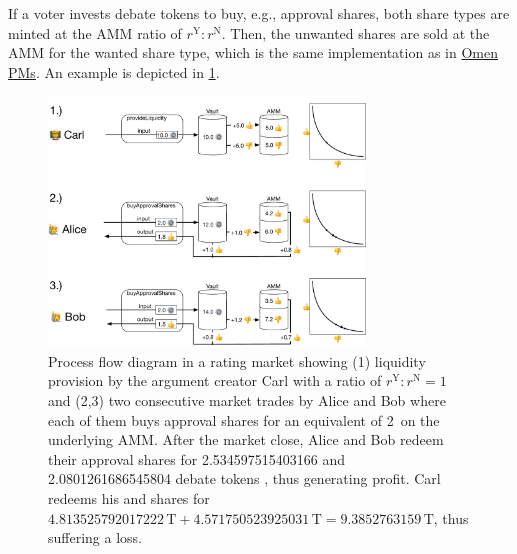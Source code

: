 \documentclass[%
aip,
amsmath,amssymb,
reprint,%
unsortedaddress,
nofootinbib
]{revtex4-2}
\newcommand{\T}{\text{T}}\newcommand{\debateTokens}{debate tokens}
\newcommand{\Y}{\text{Y}}
\newcommand{\N}{\text{N}}
\begin{document}
If a voter invests \debateTokens{} to buy, e.g., approval shares,
both share types are minted at the  \ac{AMM} ratio of $r^\Y: r^\N$.
Then, the unwanted shares are sold at the \ac{AMM} for the wanted share type, 
which is the same implementation as in 
\href{https://omen.eth.link/}{Omen \acp{PM}}\cite{Omen2020}.
An example is depicted in \cref{fig:RatingMarket}.
\begin{figure}
	\includegraphics[width=0.75\textwidth]{Graphics/RatingMarket.pdf}
	\caption{Process flow diagram in a rating market showing
	(1) liquidity provision by the argument creator Carl with a ratio of $r^\Y:r^\N=1$
	and 
	(2,3) two consecutive market trades by Alice and Bob where each of them buys approval shares for an equivalent of 2\,\T{} on the underlying \ac{AMM}.
	After the market close, 
	Alice and Bob redeem their approval shares \Y{} for \num[round-mode=places,round-precision=1]{2.534597515403166}
	and
	\num[round-mode=places,round-precision=1]{2.0801261686545804}
	\debateTokens{} \T{}, thus generating profit.
	Carl redeems his \Y{} and \N{} shares for
	$\num[round-mode=places,round-precision=1]{4.813525792017222}\,\T
	+\num[round-mode=places,round-precision=1]{4.571750523925031}\,\T
	=\num[round-mode=places,round-precision=1]{9.3852763159}\,\T$, thus suffering a loss.
}
	\label{fig:RatingMarket}
\end{figure}




\end{document}
